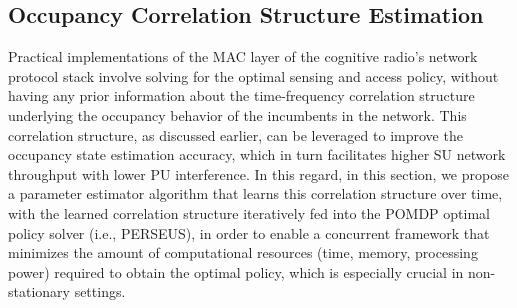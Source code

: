 \documentclass[12pt, draftcls, onecolumn]{IEEEtran}
\begin{document}
\subsection{Occupancy Correlation Structure Estimation}\label{II.I}
Practical implementations of the MAC layer of the cognitive radio's network protocol stack involve solving for the optimal sensing and access policy, without having any prior information about the time-frequency correlation structure underlying the occupancy behavior of the incumbents in the network. This correlation structure, as discussed earlier, can be leveraged to improve the occupancy state estimation accuracy, which in turn facilitates higher SU network throughput with lower PU interference. In this regard, in this section, we propose a parameter estimator algorithm that learns this correlation structure over time, with the learned correlation structure iteratively fed into the POMDP optimal policy solver (i.e., PERSEUS), in order to enable a concurrent framework that minimizes the amount of computational resources (time, memory, processing power) required to obtain the optimal policy, which is especially crucial in non-stationary settings.
\end{document}
